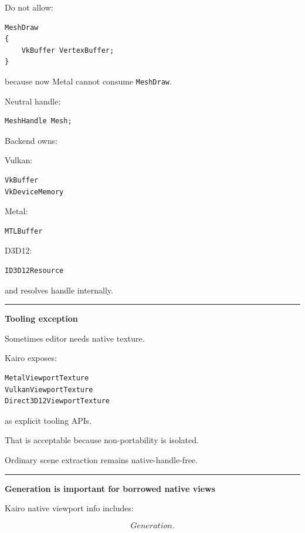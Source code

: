 Do not allow:

\begin{verbatim}
MeshDraw
{
    VkBuffer VertexBuffer;
}
\end{verbatim}

because now Metal cannot consume \texttt{MeshDraw}.

Neutral handle:

\begin{verbatim}
MeshHandle Mesh;
\end{verbatim}

Backend owns:

Vulkan:

\begin{verbatim}
VkBuffer
VkDeviceMemory
\end{verbatim}

Metal:

\begin{verbatim}
MTLBuffer
\end{verbatim}

D3D12:

\begin{verbatim}
ID3D12Resource
\end{verbatim}

and resolves handle internally.

\begin{center}\rule{0.5\linewidth}{0.5pt}\end{center}

\textbf{Tooling exception}

Sometimes editor needs native texture.

Kairo exposes:

\begin{verbatim}
MetalViewportTexture
VulkanViewportTexture
Direct3D12ViewportTexture
\end{verbatim}

as explicit tooling APIs.

That is acceptable because non-portability is isolated.

Ordinary scene extraction remains native-handle-free.

\begin{center}\rule{0.5\linewidth}{0.5pt}\end{center}

\textbf{Generation is important for borrowed native views}

Kairo native viewport info includes:

\[
Generation.
\]

